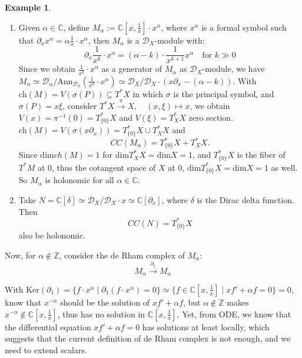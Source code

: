 \documentclass[openany]{book}
\theoremstyle{definition} %
\newtheorem{example}[theorem]{Example}       %
\theoremstyle{remark}
\begin{document}
\begin{example}
    \quad
    \begin{enumerate}
        \item Given $\alpha \in \mathbb{C}$, define $M_{\alpha} := \mathbb{C}[x, \frac{1}{x}] \cdot x^{\alpha}$, where $x^{\alpha}$ is a formal symbol such that $\partial_x x^{\alpha} = \alpha \frac{1}{x}\cdot x^{\alpha}$, then  $M_{\alpha}$ is a $\mathcal{D}_X$-module with: $$\partial_{x} \frac{1}{x^{k}} \cdot x^{\alpha} = (\alpha - k) \cdot \frac{1}{x^{k+1}} x^{\alpha} \quad \text{for } k \gg 0$$Since we obtain $\frac{1}{x^{k}}\cdot x^{\alpha}$ as a generator of $M_{\alpha}$ as $\mathcal{D}_{X}$-module, we have $M_{\alpha} \simeq \mathcal{D}_{\alpha} /\mathrm{Ann}_{\mathcal{D}_{\alpha}}( \frac{1}{x^{k}}\cdot x^{\alpha})\simeq\mathcal{D}_X / \mathcal{D}_X \cdot (x\partial_x - (\alpha - k))$. With $\mathrm{ch}(M)=V(\sigma(P))\subseteq T^{\ast}X$ in which $\sigma$ is the principal symbol, and $\sigma(P)=x\xi$, consider $T^{\ast}X\xrightarrow{\pi} X,\quad (x,\xi)\mapsto x$, we obtain $V(x)=\pi ^{-1}(0)=T^{\ast}_{\{0\}}X$ and $V(\xi)=T^{\ast}_{X}X$ zero section.  $\mathrm{ch}(M)=V(\sigma(x\partial_{x}))=T^{\ast}_{\{0\}}X\cup T_{X}^{\ast}X$ and  $$CC(M_{\alpha}) = T_{\{0\}}^*X + T_X^*X.$$Since $\mathrm{dim}ch(M)=1$ for $\mathrm{dim}T^{\ast}_{X}X=\mathrm{dim}X=1$, and $T^{\ast}_{\{0\}}X$ is the fiber of $T^{\ast}M$ at $0$, thus the cotangent space of $X$ at $0$, $\mathrm{dim}T^{\ast}_{\{0\}}X=\mathrm{dim}X=1$ as well. So  $M_{\alpha}$ is holonomic for all $\alpha \in \mathbb{C}$.
        \item Take $N = \mathbb{C}[\delta] \simeq \mathcal{D}_X / \mathcal{D}_X \cdot x \simeq \mathbb{C}[\partial_x]$, where $\delta$ is the Dirac delta function. Then $$CC(N) = T_{\{0\}}^*X$$also be holonomic.

    \end{enumerate}

\end{example}

Now, for $\alpha \notin \mathbb{Z}$, consider the de Rham complex of $M_{\alpha}$: $$M_{\alpha} \xrightarrow{\partial_1} M_{\alpha}$$

With $\text{Ker}(\partial_1) = \{f \cdot x^{\alpha} \mid \partial_1(f \cdot x^{\alpha}) = 0\}\simeq \{f \in \mathbb{C}[x, \frac{1}{x}] \mid xf' + \alpha f= 0\} = 0$, know that $x^{-\alpha}$ should be the solution of $xf'+\alpha f$, but $\alpha\not\in \mathbb{Z}$ makes $x^{-\alpha}\not\in \mathbb{C}\left[ x, \frac{1}{x} \right]$, thus has no solution in $\mathbb{C}[x, \frac{1}{x}]$. Yet, from ODE, we know that the differential equation $xf'+\alpha f=0$ has solutions at least locally, which suggests that the current definition of de Rham complex is not enough, and we need to extend scalars.
\end{document}
